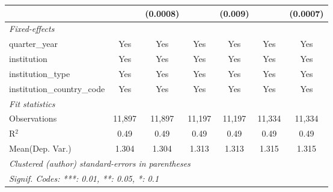 \begin{tabular}{lcccccc}
                                      &              & (0.0008)     &              & (0.009)        &              & (0.0007)\\   
   \midrule
   \emph{Fixed-effects}\\
   quarter\_year                      & Yes          & Yes          & Yes          & Yes            & Yes          & Yes\\  
   institution                        & Yes          & Yes          & Yes          & Yes            & Yes          & Yes\\  
   institution\_type                  & Yes          & Yes          & Yes          & Yes            & Yes          & Yes\\  
   institution\_country\_code         & Yes          & Yes          & Yes          & Yes            & Yes          & Yes\\  
   \midrule
   \emph{Fit statistics}\\
   Observations                       & 11,897       & 11,897       & 11,197       & 11,197         & 11,334       & 11,334\\  
   R$^2$                              & 0.49         & 0.49         & 0.49         & 0.49           & 0.49         & 0.49\\  
Mean(Dep. Var.) & 1.304 & 1.304 & 1.313 & 1.313 & 1.315 & 1.315 \\
   \midrule \midrule
   \multicolumn{7}{l}{\emph{Clustered (author) standard-errors in parentheses}}\\
   \multicolumn{7}{l}{\emph{Signif. Codes: ***: 0.01, **: 0.05, *: 0.1}}\\
\end{tabular}
\par\endgroup
